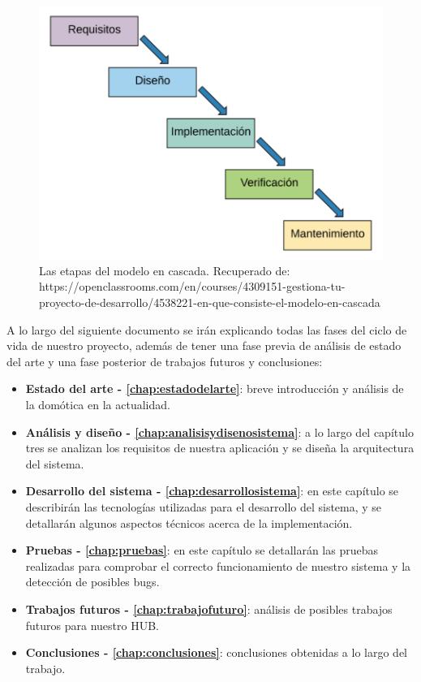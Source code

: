 \begin{figure}[H]
\centering
\includegraphics[width=5.00in]{images/desarrollo_cascada.PNG}
\caption{Las etapas del modelo en cascada.
 Recuperado de: https://openclassrooms.com/en/courses/4309151-gestiona-tu-proyecto-de-desarrollo/4538221-en-que-consiste-el-modelo-en-cascada}
\label{fig:tecnologias_populares}
\end{figure}


A lo largo del siguiente documento se irán explicando todas las fases del ciclo de vida de nuestro proyecto, además de tener una fase previa de análisis de estado del 
arte y una fase posterior de trabajos futuros y conclusiones:
\begin{itemize}
\item\textbf{Estado del arte - \autoref{chap:estadodelarte}}: breve introducción y análisis de la domótica en la actualidad.
\item\textbf{Análisis y diseño - \autoref{chap:analisisydisenosistema}}: a lo largo del capítulo tres se analizan los requisitos de nuestra aplicación y se diseña la arquitectura del sistema.
\item\textbf{Desarrollo del sistema - \autoref{chap:desarrollosistema}}: en este capítulo se describirán las tecnologías utilizadas para el desarrollo del sistema, y se detallarán 
algunos aspectos técnicos acerca de la implementación.
\item\textbf{Pruebas - \autoref{chap:pruebas}}: en este capítulo se detallarán las pruebas realizadas para comprobar el correcto funcionamiento
de nuestro sistema y la detección de posibles bugs.
\item\textbf{Trabajos futuros - \autoref{chap:trabajofuturo}}: análisis de posibles trabajos futuros para nuestro HUB.
\item\textbf{Conclusiones - \autoref{chap:conclusiones}}: conclusiones obtenidas a lo largo del trabajo.
\end{itemize}


\newpage \thispagestyle{empty} %